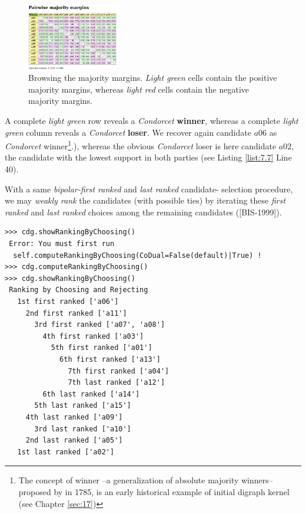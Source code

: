 \begin{figure}[h]
\sidecaption
\includegraphics[width=4cm]{Figures/majorityMargins.png}
\caption{Browsing the majority margins. \emph{Light green} cells contain the positive majority margins, whereas \emph{light red} cells contain the negative majority margins.}
\label{fig:7.4}       %
\end{figure}

A complete \emph{light green} row reveals a \emph{Condorcet} \textbf{winner}, whereas a complete \emph{light green} column reveals a \emph{Condorcet} \textbf{loser}. We recover again candidate $a06$ as \emph{Condorcet} winner\footnote{The concept of \Condorcet winner --a generalization of absolute majority winners-- proposed by \Condorcet in 1785, is an early historical example of initial digraph kernel (see Chapter \ref{sec:17})}.), whereas the obvious \emph{Condorcet} loser is here candidate $a02$, the candidate with the lowest support in both parties (see Listing \ref{list:7.7} Line 40).

With a same \emph{bipolar-first ranked} and \emph{last ranked} candidate- selection procedure, we may \emph{weakly rank} the candidates (with possible ties) by iterating these \emph{first ranked} and \emph{last ranked} choices among the remaining candidates ([BIS-1999]).

\begin{lstlisting}[caption={Ranking by iterating choosing the \emph{first} and \emph{last} remaining candidates },label=list:7.10,basicstyle=\footnotesize]
>>> cdg.showRankingByChoosing()
 Error: You must first run
  self.computeRankingByChoosing(CoDual=False(default)|True) !
>>> cdg.computeRankingByChoosing()
>>> cdg.showRankingByChoosing()
 Ranking by Choosing and Rejecting
   1st first ranked ['a06']
     2nd first ranked ['a11']
       3rd first ranked ['a07', 'a08']
         4th first ranked ['a03']
           5th first ranked ['a01']
             6th first ranked ['a13']
               7th first ranked ['a04']
               7th last ranked ['a12']
	     6th last ranked ['a14']
	   5th last ranked ['a15']
	 4th last ranked ['a09']
       3rd last ranked ['a10']
     2nd last ranked ['a05']
   1st last ranked ['a02']
\end{lstlisting}
 

